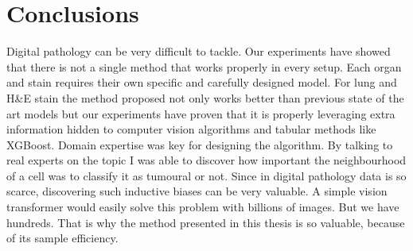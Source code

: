 \chapter{Conclusions}

Digital pathology can be very difficult to tackle. Our experiments have showed that there is not a single method that works properly in every setup. Each organ and stain requires their own specific and carefully designed model. For lung and H\&E stain the method proposed not only works better than previous state of the art models but our experiments have proven that it is properly leveraging extra information hidden to computer vision algorithms and tabular methods like XGBoost. Domain expertise was key for designing the algorithm. By talking to real experts on the topic I was able to discover how important the neighbourhood of a cell was to classify it as tumoural or not. Since in digital pathology data is so scarce, discovering such inductive biases can be very valuable. A simple vision transformer would easily solve this problem with billions of images. But we have hundreds. That is why the method presented in this thesis is so valuable, because of its sample efficiency.